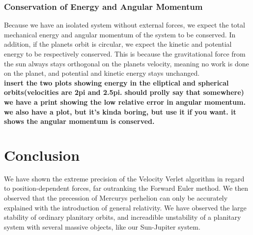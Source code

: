 \documentclass[a4paper]{article}
\begin{document}
\subsubsection{Conservation of Energy and Angular Momentum}
Because we have an isolated system without external forces, we expect the total mechanical energy and angular momentum of the system to be conserved. In addition, if the planets orbit is circular, we expect the kinetic and potential energy to be respectively conserved. This is because the gravitational force from the sun always stays orthogonal on the planets velocity, meaning no work is done on the planet, and potential and kinetic energy stays unchanged.\\
\textbf{insert the two plots showing energy in the eliptical and spherical orbits(velocities are 2pi and 2.5pi. should prolly say that somewhere)}\\
\textbf{we have a print showing the low relative error in angular momentum. we also have a plot, but it's kinda boring, but use it if you want. it shows the angular momentum is conserved.}

\section{Conclusion}\label{sec:conclusion}
We have shown the extreme precision of the Velocity Verlet algorithm in regard to position-dependent forces, far outranking the Forward Euler method.
We then observed that the precession of Mercurys perhelion can only be accurately explained with the introduction of general relativity.
We have observed the large stability of ordinary planitary orbits, and increadible unstability of a planitary system with several massive objects, like our Sun-Jupiter system.

%
%

{}
\end{document}
